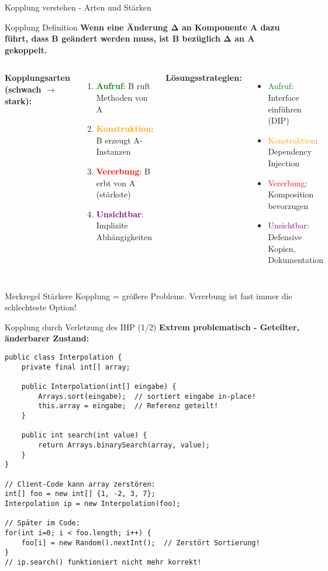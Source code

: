\begin{frame}{Kopplung verstehen - Arten und Stärken}
  \begin{exampleblock}{Kopplung Definition}
    \textbf{Wenn eine Änderung Δ an Komponente A dazu führt, dass B geändert werden muss, ist B bezüglich Δ an A gekoppelt.}
  \end{exampleblock}

  \begin{columns}[T]
    \textbf{Kopplungsarten (schwach $\rightarrow$ stark):}
    \begin{enumerate}
      \item \textcolor{green}{\textbf{Aufruf}}: B ruft Methoden von A
      \item \textcolor{orange}{\textbf{Konstruktion}}: B erzeugt A-Instanzen
      \item \textcolor{red}{\textbf{Vererbung}}: B erbt von A (stärkste)
      \item \textcolor{purple}{\textbf{Unsichtbar}}: Implizite Abhängigkeiten
    \end{enumerate}

    \textbf{Lösungsstrategien:}
    \begin{itemize}
      \item \textcolor{green}{Aufruf}: Interface einführen (DIP)
      \item \textcolor{orange}{Konstruktion}: Dependency Injection
      \item \textcolor{red}{Vererbung}: Komposition bevorzugen
      \item \textcolor{purple}{Unsichtbar}: Defensive Kopien, Dokumentation
    \end{itemize}
  \end{columns}

  \begin{exampleblock}{Merkregel}
    Stärkere Kopplung = größere Probleme. Vererbung ist fast immer die schlechteste Option!
  \end{exampleblock}
\end{frame}

\begin{frame}[fragile]{Kopplung durch Verletzung des IHP (1/2)}
  \textbf{Extrem problematisch - Geteilter, änderbarer Zustand:}
  \begin{lstlisting}[style=java, basicstyle=\tiny\ttfamily]
public class Interpolation {
    private final int[] array;

    public Interpolation(int[] eingabe) {
        Arrays.sort(eingabe);  // sortiert eingabe in-place!
        this.array = eingabe;  // Referenz geteilt!
    }

    public int search(int value) {
        return Arrays.binarySearch(array, value);
    }
}

// Client-Code kann array zerstören:
int[] foo = new int[] {1, -2, 3, 7};
Interpolation ip = new Interpolation(foo);

// Später im Code:
for(int i=0; i < foo.length; i++) {
    foo[i] = new Random().nextInt();  // Zerstört Sortierung!
}
// ip.search() funktioniert nicht mehr korrekt!
  \end{lstlisting}
\end{frame}

